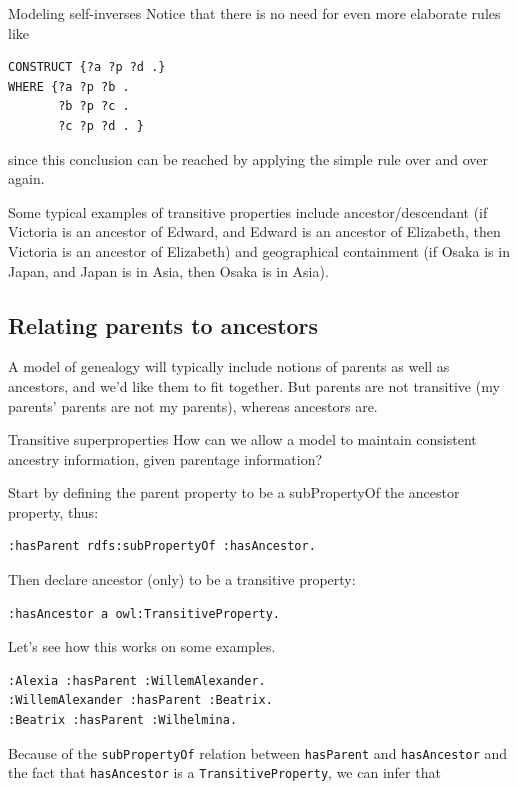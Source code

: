 \begin{challenge}{Modeling self-inverses}
Notice that there is no need for even more elaborate rules like

\begin{lstlisting}
CONSTRUCT {?a ?p ?d .}
WHERE {?a ?p ?b .
       ?b ?p ?c .
       ?c ?p ?d . }
\end{lstlisting}

since this conclusion can be reached by applying the simple rule over
and over again.

Some typical examples of transitive properties include
ancestor/descendant (if Victoria is an ancestor of Edward, and Edward is
an ancestor of Elizabeth, then Victoria is an ancestor of Elizabeth) and
geographical containment (if Osaka is in Japan, and Japan is in Asia,
then Osaka is in Asia).

\subsection{Relating parents to ancestors}

A model of genealogy will typically include notions of parents as well
as ancestors, and we'd like them to fit together. But parents are not
transitive (my parents' parents are not my parents), whereas ancestors
are.

\begin{challenge}{Transitive superproperties}
\label{chal:17}
How can we allow a model to maintain consistent ancestry information,
given parentage information?

\solution

Start by defining the parent property to be a subPropertyOf the ancestor
property, thus:

\begin{lstlisting}
:hasParent rdfs:subPropertyOf :hasAncestor.
\end{lstlisting}

Then declare ancestor (only) to be a transitive property:

\begin{lstlisting}
:hasAncestor a owl:TransitiveProperty.
\end{lstlisting}

Let's see how this works on some examples.

\begin{lstlisting}
:Alexia :hasParent :WillemAlexander.
:WillemAlexander :hasParent :Beatrix.
:Beatrix :hasParent :Wilhelmina.
\end{lstlisting}

Because of the \texttt{subPropertyOf} relation between \texttt{hasParent} and \texttt{hasAncestor}
and the fact that
\texttt{hasAncestor} is a \texttt{TransitiveProperty}, we can infer that


\end{challenge}
\end{challenge}
